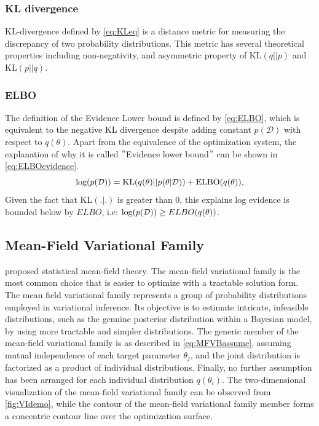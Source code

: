 \subsubsection{KL divergence}
KL-divergence defined by \autoref{eq:KLeq} is a distance metric for measuring the discrepancy of two probability distributions. This metric has several theoretical properties including non-negativity, and asymmetric property of KL$(q||p)$ and KL$(p||q)$.

\subsubsection{ELBO}
The definition of the Evidence Lower bound is defined by \autoref{eq:ELBO}, which is equivalent to the negative KL divergence despite adding constant $p(\mathcal{D})$ with respect to $q(\theta)$. 
Apart from the equivalence of the optimization system, the explanation of why it is called $"$Evidence lower bound$"$ can be shown in \autoref{eq:ELBOevidence}.
\begin{equation}
	\label{eq:ELBOevidence}
	\textnormal{log}(p(\mathcal{D})) = \text{KL}(q(\theta)||p(\theta|\mathcal{D})) + \text{ELBO}(q(\theta)),
\end{equation}
Given the fact that KL$(.|.)$ is greater than 0, this explains log evidence is bounded below by $ELBO$, i.e: $\textnormal{log}(p(\mathcal{D})) \geq ELBO(q(\theta))$.

\subsection{Mean-Field Variational Family} 
\cite{parisi1988statistical} proposed statistical mean-field theory. The mean-field variational family is the most common choice that is easier to optimize with a tractable solution form.
The mean field variational family represents a group of probability distributions employed in variational inference. Its objective is to estimate intricate, infeasible distributions, such as the genuine posterior distribution within a Bayesian model, by using more tractable and simpler distributions.
The generic member of the mean-field variational family is as described in \autoref{eq:MFVBassume}, assuming mutual independence of each target parameter $\theta_j$, and the joint distribution is factorized as a product of individual distributions. Finally, no further assumption has been arranged for each individual distribution $q(\theta_i)$.
The two-dimensional visualization of the mean-field variational family can be observed from \autoref{fig:VIdemo}, while the contour of the mean-field variational family member forms a concentric contour line over the optimization surface.





